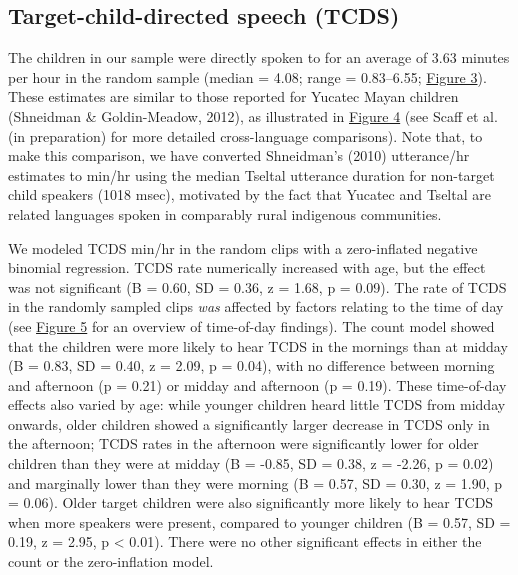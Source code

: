 \documentclass[,man,floatsintext]{apa6}
\begin{document}
\subsection{Target-child-directed speech
(TCDS)}\label{target-child-directed-speech-tcds}

The children in our sample were directly spoken to for an average of
3.63 minutes per hour in the random sample (median = 4.08; range =
0.83--6.55; \protect\hyperlink{fig3}{Figure 3}). These estimates are
similar to those reported for Yucatec Mayan children (Shneidman \&
Goldin-Meadow, 2012), as illustrated in \protect\hyperlink{fig4}{Figure
4} (see Scaff et al. (in preparation) for more detailed cross-language
comparisons). Note that, to make this comparison, we have converted
Shneidman's (2010) utterance/hr estimates to min/hr using the median
Tseltal utterance duration for non-target child speakers (1018 msec),
motivated by the fact that Yucatec and Tseltal are related languages
spoken in comparably rural indigenous communities.

We modeled TCDS min/hr in the random clips with a zero-inflated negative
binomial regression. TCDS rate numerically increased with age, but the
effect was not significant (B = 0.60, SD = 0.36, z = 1.68, p = 0.09).
The rate of TCDS in the randomly sampled clips \emph{was} affected by
factors relating to the time of day (see \protect\hyperlink{fig5}{Figure
5} for an overview of time-of-day findings). The count model showed that
the children were more likely to hear TCDS in the mornings than at
midday (B = 0.83, SD = 0.40, z = 2.09, p = 0.04), with no difference
between morning and afternoon (p = 0.21) or midday and afternoon (p =
0.19). These time-of-day effects also varied by age: while younger
children heard little TCDS from midday onwards, older children showed a
significantly larger decrease in TCDS only in the afternoon; TCDS rates
in the afternoon were significantly lower for older children than they
were at midday (B = -0.85, SD = 0.38, z = -2.26, p = 0.02) and
marginally lower than they were morning (B = 0.57, SD = 0.30, z = 1.90,
p = 0.06). Older target children were also significantly more likely to
hear TCDS when more speakers were present, compared to younger children
(B = 0.57, SD = 0.19, z = 2.95, p \textless{} 0.01). There were no other
significant effects in either the count or the zero-inflation model.
\end{document}
